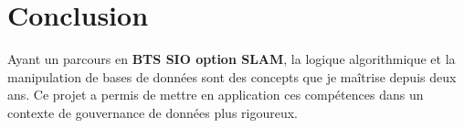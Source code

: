 \documentclass[12pt, a4paper]{article}
\begin{document}
\section{Conclusion}
Ayant un parcours en \textbf{BTS SIO option SLAM}, la logique algorithmique et la manipulation de bases de données sont des concepts que je maîtrise depuis deux ans. Ce projet a permis de mettre en application ces compétences dans un contexte de gouvernance de données plus rigoureux.
\end{document}
